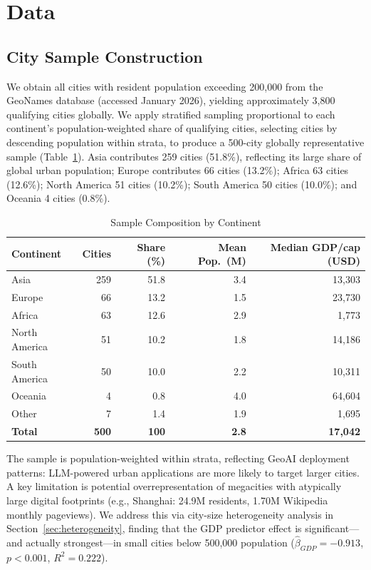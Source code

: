 \documentclass[12pt]{article}
\begin{document}
\section{Data}
\label{sec:data}

\subsection{City Sample Construction}

We obtain all cities with resident population exceeding 200,000 from the GeoNames database (accessed January 2026), yielding approximately 3,800 qualifying cities globally. We apply stratified sampling proportional to each continent's population-weighted share of qualifying cities, selecting cities by descending population within strata, to produce a 500-city globally representative sample (Table~\ref{tab:sample_composition}). Asia contributes 259 cities (51.8\%), reflecting its large share of global urban population; Europe contributes 66 cities (13.2\%); Africa 63 cities (12.6\%); North America 51 cities (10.2\%); South America 50 cities (10.0\%); and Oceania 4 cities (0.8\%).

\begin{table}[htbp]
\caption{Sample Composition by Continent}
\label{tab:sample_composition}
\centering
\begin{tabular}{lrrrr}
\toprule
Continent & Cities & Share (\%) & Mean Pop.\ (M) & Median GDP/cap (USD) \\
\midrule
Asia          & 259 & 51.8 & 3.4 & 13,303 \\
Europe        &  66 & 13.2 & 1.5 & 23,730 \\
Africa        &  63 & 12.6 & 2.9 &  1,773 \\
North America &  51 & 10.2 & 1.8 & 14,186 \\
South America &  50 & 10.0 & 2.2 & 10,311 \\
Oceania       &   4 &  0.8 & 4.0 & 64,604 \\
Other         &   7 &  1.4 & 1.9 &  1,695 \\
\midrule
\textbf{Total} & \textbf{500} & \textbf{100} & \textbf{2.8} & \textbf{17,042} \\
\bottomrule
\end{tabular}
\end{table}

The sample is population-weighted within strata, reflecting GeoAI deployment patterns: LLM-powered urban applications are more likely to target larger cities. A key limitation is potential overrepresentation of megacities with atypically large digital footprints (e.g., Shanghai: 24.9M residents, 1.70M Wikipedia monthly pageviews). We address this via city-size heterogeneity analysis in Section~\ref{sec:heterogeneity}, finding that the GDP predictor effect is significant---and actually strongest---in small cities below 500,000 population ($\hat{\beta}_{GDP} = -0.913$, $p < 0.001$, $R^2 = 0.222$).
\end{document}
